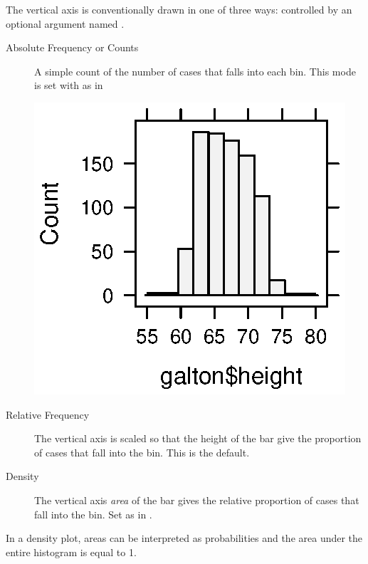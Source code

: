 The vertical axis is conventionally drawn in one of three ways:
controlled by an optional argument named .
\begin{description}
\item[Absolute Frequency or Counts]  A simple count of the number of cases that
  falls into each bin.  This mode is set with
   as in 
\begin{Schunk}
\end{Schunk}
\includegraphics{Figures/variation-var3-hist}

\item[Relative Frequency] The vertical axis is scaled so that the 
height of the bar give the proportion of cases that fall into the
bin.  This is the default.
\item[Density] The vertical axis 
{\em area} of the bar gives the relative proportion of cases that fall
into the bin.  Set  as in  .   %
\end{description}
In a density plot, areas can be interpreted as probabilities and the
area under the entire histogram is equal to 1.

